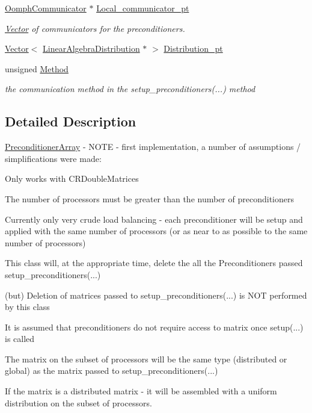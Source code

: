 \begin{DoxyCompactItemize}
\hyperlink{classoomph_1_1OomphCommunicator}{Oomph\+Communicator} $\ast$ \hyperlink{classoomph_1_1PreconditionerArray_a8a0fee7aa5e23878e57186dcef8c719d}{Local\+\_\+communicator\+\_\+pt}
\begin{DoxyCompactList}\small\item\em \hyperlink{classoomph_1_1Vector}{Vector} of communicators for the preconditioners. \end{DoxyCompactList}\item 
\hyperlink{classoomph_1_1Vector}{Vector}$<$ \hyperlink{classoomph_1_1LinearAlgebraDistribution}{Linear\+Algebra\+Distribution} $\ast$ $>$ \hyperlink{classoomph_1_1PreconditionerArray_ac233896152000f13b3527d9ff087c113}{Distribution\+\_\+pt}
\item 
unsigned \hyperlink{classoomph_1_1PreconditionerArray_a28dd7675a57d1402e4b06c368ffa1e3b}{Method}
\begin{DoxyCompactList}\small\item\em the communication method in the setup\+\_\+preconditioners(...) method \end{DoxyCompactList}\end{DoxyCompactItemize}


\subsection{Detailed Description}
\hyperlink{classoomph_1_1PreconditionerArray}{Preconditioner\+Array} -\/ N\+O\+TE -\/ first implementation, a number of assumptions / simplifications were made\+: 


\begin{DoxyEnumerate}
\item Only works with C\+R\+Double\+Matrices
\item The number of processors must be greater than the number of preconditioners
\item Currently only very crude load balancing -\/ each preconditioner will be setup and applied with the same number of processors (or as near to as possible to the same number of processors)
\item This class will, at the appropriate time, delete the all the Preconditioners passed setup\+\_\+preconditioners(...)
\item (but) Deletion of matrices passed to setup\+\_\+preconditioners(...) is N\+OT performed by this class
\item It is assumed that preconditioners do not require access to matrix once setup(...) is called
\item The matrix on the subset of processors will be the same type (distributed or global) as the matrix passed to setup\+\_\+preconditioners(...)
\item If the matrix is a distributed matrix -\/ it will be assembled with a uniform distribution on the subset of processors. 
\end{DoxyEnumerate}

